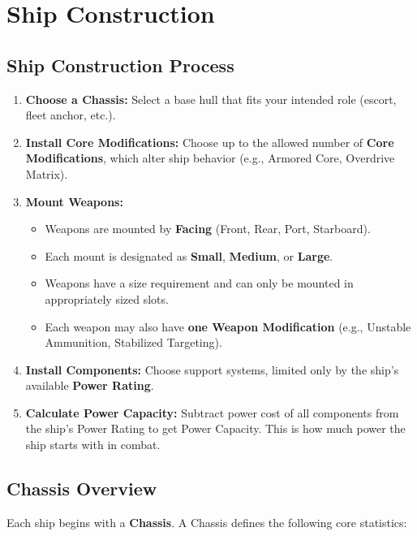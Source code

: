 \section{Ship Construction}

\subsection{Ship Construction Process}

\begin{enumerate}
    \item \textbf{Choose a Chassis:} Select a base hull that fits your intended role (escort, fleet anchor, etc.).

    \item \textbf{Install Core Modifications:} Choose up to the allowed number of \textbf{Core Modifications}, which alter ship behavior (e.g., Armored Core, Overdrive Matrix).
    
    \item \textbf{Mount Weapons:}
    \begin{itemize}
        \item Weapons are mounted by \textbf{Facing} (Front, Rear, Port, Starboard).
        \item Each mount is designated as \textbf{Small}, \textbf{Medium}, or \textbf{Large}.
        \item Weapons have a size requirement and can only be mounted in appropriately sized slots.
        \item Each weapon may also have \textbf{one Weapon Modification} (e.g., Unstable Ammunition, Stabilized Targeting).
    \end{itemize}
    
    \item \textbf{Install Components:} Choose support systems, limited only by the ship’s available \textbf{Power Rating}.
    
    \item \textbf{Calculate Power Capacity:} Subtract power cost of all components from the ship's Power Rating to get Power Capacity. This is how much power the ship starts with in combat.
\end{enumerate}

\subsection{Chassis Overview}

Each ship begins with a \textbf{Chassis}. A Chassis defines the following core statistics:

